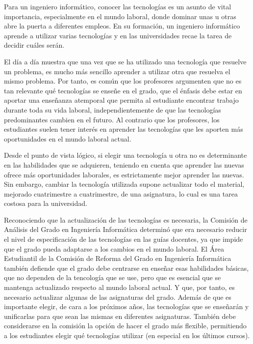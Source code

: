 Para un ingeniero informático,
conocer las tecnologías es un asunto de vital importancia,
especialmente en el mundo laboral,
donde dominar unas u otras abre la puerta a diferentes empleos.
En su formación,
un ingeniero informático aprende a utilizar varias tecnologías
y en las universidades recae la tarea de decidir cuáles serán.

El día a día muestra que
una vez que se ha utilizado una tecnología que resuelve un problema,
es mucho más sencillo aprender a utilizar otra que resuelva el mismo problema.
Por tanto, es común que los profesores argumenten que
no es tan relevante qué tecnologías se enseñe en el grado,
que el énfasis debe estar en aportar una enseñanza atemporal
que permita al estudiante encontrar trabajo durante toda su vida laboral,
independientemente de que las tecnologías predominantes cambien en el futuro.
Al contrario que los profesores,
los estudiantes suelen tener interés en aprender las tecnologías que
les aporten más oportunidades en el mundo laboral actual.

Desde el punto de vista lógico,
si elegir una tecnología u otra no es determinante
en las habilidades que se adquieren,
teniendo en cuenta que aprender las nuevas ofrece más oportunidades laborales,
es estrictamente mejor aprender las nuevas.
Sin embargo, cambiar la tecnología utilizada
supone actualizar todo el material,
mejorado cuatrimestre a cuatrimestre,
de una asignatura,
lo cual es una tarea costosa para la universidad.

Reconociendo que la actualización de las tecnologías es necesaria,
la Comisión de Análisis del Grado en Ingeniería Informática
determinó que era necesario
reducir el nivel de especificación de las tecnologías en las guías docentes,
ya que impide que el grado pueda adaptarse a los cambios en el mundo laboral.
El Área Estudiantil de
la Comisión de Reforma del Grado en Ingeniería Informática
también defiende que
el grado debe centrarse en enseñar esas habilidades básicas,
que no dependen de la tencología que se use,
pero que es esencial que se mantenga actualizado respecto al mundo laboral actual.
Y que, por tanto, es necesario actualizar algunas de las asignaturas del grado.
Además de que es importante elegir, de cara a los próximos años,
las tecnologías que se enseñarán y unificarlas para que
sean las mismas en diferentes asignaturas.
También debe considerarse en la comisión la opción de hacer el grado más flexible,
permitiendo a los estudiantes elegir qué tecnologías utilizar
(en especial en los últimos cursos).

